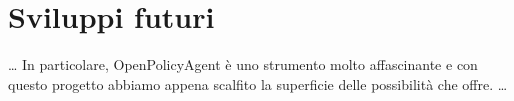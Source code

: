\section{Sviluppi futuri}
\dots
In particolare, OpenPolicyAgent è uno strumento molto affascinante e con questo progetto abbiamo 
appena scalfito la superficie delle possibilità che offre.  
\dots